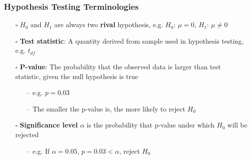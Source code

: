 \documentclass[handout]{beamer}
\begin{document}
\begin{frame}
    \frametitle{Hypothesis Testing Terminologies}
    \begin{itemize}[wide = 0pt]
        \item[$\square$] \textbf{$H_0$} and \textbf{$H_1$} are always two \textbf{\color{red}rival} hypothesis, e.g. $H_0$: $\mu =0$, $H_1$: $\mu \neq 0$
        \item[$\square$] \textbf{\color{red}Test statistic}: A quantity derived from sample used in hypothesis testing, e.g. $t_{df}$
        \item[$\square$] \textbf{\color{red}P-value}: The probability that the observed data is larger than test statistic, given the null hypothesis is true 
        \begin{itemize}
            \item[--] e.g. $p=0.03$
            \item[--] The smaller the p-value is, the more likely to reject $H_0$
        \end{itemize}
        \item[$\square$] \textbf{\color{red}Significance level} $\alpha$ is the probability that p-value under which $H_0$ will be rejected
        \begin{itemize}
            \item[--] e.g. If $\alpha=0.05$, $p=0.03<\alpha$, reject $H_0$
        \end{itemize}
    \end{itemize} 
    \vspace*{\fill}
\end{frame}
\end{document}
